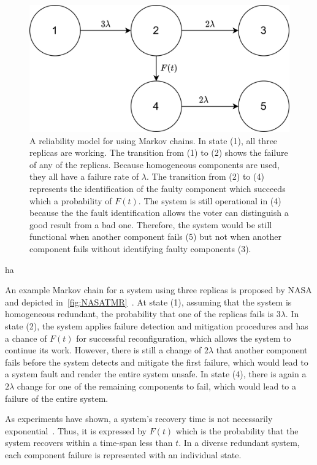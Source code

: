 \begin{figure}[!hb]
	\centering
	\includegraphics[width=0.8\linewidth]{images/TriplexSystemNASA}
	\caption{A reliability model for  using Markov chains. In state (1), all three replicas are working. The transition from (1) to (2) shows the failure of any of the replicas. Because homogeneous components are used, they all have a failure rate of $\lambda$. The transition from (2) to (4) represents the identification of the faulty component which succeeds which a probability of $F(t)$. The system is still operational in (4) because the the fault identification allows the voter can distinguish a good result from a bad one. Therefore, the system would be still functional when another component fails (5) but not when another component fails without identifying faulty components (3).}
	\label{fig:NASATMR}
\end{figure}ha 

An example Markov chain for a system using three replicas is proposed by NASA and depicted in~\autoref{fig:NASATMR}~\cite{NASAMarkovChains}.
At state (1), assuming that the system is homogeneous redundant, the probability that one of the replicas fails is $3\lambda$.
In state (2), the system applies failure detection and mitigation procedures and has a chance of $F(t)$ for successful reconfiguration, which allows the system to continue its work.
However, there is still a change of $2\lambda$ that another component fails before the system detects and mitigate the first failure, which would lead to a system fault and render the entire system unsafe.
In state (4), there is again a $2\lambda$ change for one of the remaining components to fail, which would lead to a failure of the entire system.

As experiments have shown, a system's recovery time is not necessarily exponential~\cite{TheoryAndPracticeReliableSystem}.
Thus, it is expressed by $F(t)$ which is the probability that the system recovers within a time-span less than $t$.
In a diverse redundant system, each component failure is represented with an individual state.

